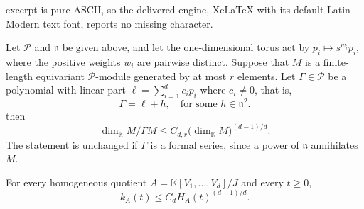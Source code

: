 \documentclass[10pt,a4paper]{amsart}
\newcommand\K{\ensuremath{\mathbb{K}}}
\begin{document}
excerpt is pure ASCII, so the delivered engine, XeLaTeX with its default Latin Modern text font, reports no missing character.
\begin{theorem}\label{thm:green-boundary}
Let $\mathscr{P}$ and $\mathfrak{n}$ be given above,
and let the one-dimensional torus act by
$p_i\mapsto s^{w_i}p_i$, where the positive weights $w_i$ are pairwise
distinct.  Suppose that $M$ is a finite-length equivariant
$\mathscr P$-module generated by at most $r$ elements.  Let $\Gamma\in \mathscr{P}$ be a polynomial with linear part $\ell=\sum_{i=1}^dc_ip_i$ where $c_i\neq 0$, that is,
\[
 \Gamma=\ell+h,\quad \text{for some }h\in \mathfrak{n}^2.
\]
then
\begin{equation}\label{eq:weighted-green-boundary}
 \dim_\K M/\Gamma M
 \le C_{d,r}\bigl(\dim_\K M\bigr)^{(d-1)/d}.
\end{equation}
The statement is unchanged if $\Gamma$ is a formal series, since a power
of $\mathfrak{n}$ annihilates $M$.
\end{theorem}

\begin{proposition}
\label{prop:norm-defect}
For every homogeneous quotient $A=\K[V_1,\ldots,V_d]/J$ and every
$t\ge0$,
\begin{equation}\label{eq:norm-defect}
        k_A(t)\le C_dH_A(t)^{(d-1)/d}.
\end{equation}
\end{proposition}
\end{document}
